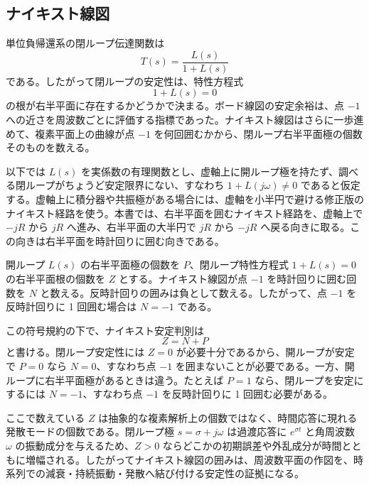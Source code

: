 \subsection{ナイキスト線図}

単位負帰還系の閉ループ伝達関数は
\begin{equation}
  T(s)=\frac{L(s)}{1+L(s)}
\end{equation}
である。したがって閉ループの安定性は、特性方程式
\begin{equation}
  1+L(s)=0
\end{equation}
の根が右半平面に存在するかどうかで決まる。ボード線図の安定余裕は、点 $-1$ への近さを周波数ごとに評価する指標であった。ナイキスト線図はさらに一歩進めて、複素平面上の曲線が点 $-1$ を何回囲むかから、閉ループ右半平面極の個数そのものを数える。

以下では $L(s)$ を実係数の有理関数とし、虚軸上に開ループ極を持たず、調べる閉ループがちょうど安定限界にない、すなわち $1+L(j\omega)\ne0$ であると仮定する。虚軸上に積分器や共振極がある場合には、虚軸を小半円で避ける修正版のナイキスト経路を使う。本書では、右半平面を囲むナイキスト経路を、虚軸上で $-jR$ から $jR$ へ進み、右半平面の大半円で $jR$ から $-jR$ へ戻る向きに取る。この向きは右半平面を時計回りに囲む向きである。

\begin{definition}[囲み数の符号規約]
開ループ $L(s)$ の右半平面極の個数を $P$、閉ループ特性方程式 $1+L(s)=0$ の右半平面根の個数を $Z$ とする。ナイキスト線図が点 $-1$ を時計回りに囲む回数を $N$ と数える。反時計回りの囲みは負として数える。したがって、点 $-1$ を反時計回りに 1 回囲む場合は $N=-1$ である。
\end{definition}

この符号規約の下で、ナイキスト安定判別は
\begin{equation}
  Z=N+P
\end{equation}
と書ける。閉ループ安定性には $Z=0$ が必要十分であるから、開ループが安定で $P=0$ なら $N=0$、すなわち点 $-1$ を囲まないことが必要である。一方、開ループに右半平面極があるときは違う。たとえば $P=1$ なら、閉ループを安定にするには $N=-1$、すなわち点 $-1$ を反時計回りに 1 回囲む必要がある。

ここで数えている $Z$ は抽象的な複素解析上の個数ではなく、時間応答に現れる発散モードの個数である。閉ループ極 $s=\sigma+j\omega$ は過渡応答に $e^{\sigma t}$ と角周波数 $\omega$ の振動成分を与えるため、$Z>0$ ならどこかの初期誤差や外乱成分が時間とともに増幅される。したがってナイキスト線図の囲みは、周波数平面の作図を、時系列での減衰・持続振動・発散へ結び付ける安定性の証拠になる。

